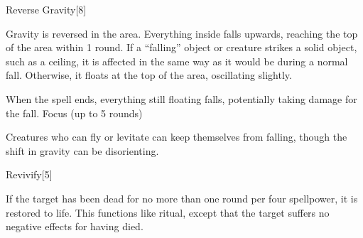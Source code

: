 \begin{spellsection}{Reverse Gravity}[8]
    \begin{spellheader}
    \end{spellheader}
    \begin{spellcontent}
        \begin{spelltargetinginfo}
        \end{spelltargetinginfo}
        \begin{spelleffects}
            \spelleffect Gravity is reversed in the area. Everything inside falls upwards, reaching the top of the area within 1 round. If a ``falling'' object or creature strikes a solid object, such as a ceiling, it is affected in the same way as it would be during a normal fall. Otherwise, it floats at the top of the area, oscillating slightly.

            When the spell ends, everything still floating falls, potentially taking damage for the fall.
            \spelldur Focus (up to 5 rounds)
        \end{spelleffects}
    \end{spellcontent}
    \begin{spellfooter}
        \spellnotes Creatures who can fly or levitate can keep themselves from falling, though the shift in gravity can be disorienting.
        \miscastyou
    \end{spellfooter}
\end{spellsection}

\begin{spellsection}{Revivify}[5]
    \begin{spellheader}
    \end{spellheader}
    \begin{spellcontent}
        \begin{spelltargetinginfo}
        \end{spelltargetinginfo}
        \begin{spelleffects}
            \spelleffect If the target has been dead for no more than one round per four spellpower, it is restored to life. This functions like  ritual, except that the target suffers no negative effects for having died.
        \end{spelleffects}
    \end{spellcontent}
    \begin{spellfooter}
        \miscastexplode
    \end{spellfooter}
\end{spellsection}

